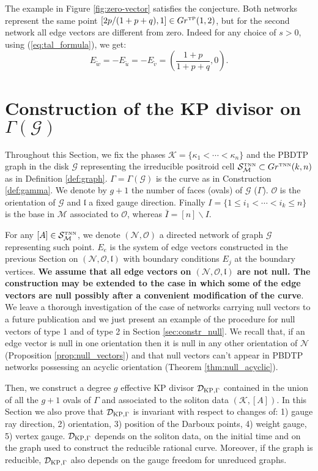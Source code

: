 \documentclass[11pt]{amsart}
\theoremstyle{plain}
\numberwithin{equation}{section}
\def \GTNN {{Gr^{\mbox{\tiny TNN}} (k,n)}}
\def \DKP {{\mathcal D}_{\textup{\scriptsize KP},\Gamma}}
\def \S {{\mathcal S}_{\mathcal M}^{\mbox{\tiny TNN}}}
\begin{document}
The example in Figure \ref{fig:zero-vector} satisfies the conjecture. Both networks represent the same point 
$[ 2p/(1+p+q),1] \in Gr^{\mbox{\tiny TP}}(1,2)$, but for the second network all edge vectors are different from zero. Indeed for any choice of $s>0$, using (\ref{eq:tal_formula}), we get:
$$
E_{\tilde w}=-E_{\tilde u}=-E_{\tilde v}=\left(\frac{1+p}{1+p+q},0\right).
$$

\section{Construction of the KP divisor on $\Gamma(\mathcal G)$}\label{sec:anycurve}

Throughout this Section, we fix the phases ${\mathcal K}= \{ \kappa_1 <\cdots< \kappa_n\}$ and the PBDTP graph in the disk $\mathcal G$ representing the irreducible positroid cell $\S \subset \GTNN$ as in Definition \ref{def:graph}. $\Gamma =\Gamma(\mathcal G)$ is the curve as in Construction
\ref{def:gamma}. We denote by $g+1$ the number of faces (ovals) of $\mathcal G$ ($\Gamma$).
$\mathcal O$ is the orientation of $\mathcal G$ and $\mathfrak l$ a fixed gauge direction. Finally $I=\{ 1\le i_1<\cdots < i_k\le n\}$ is the base in $\mathcal M$ associated to $\mathcal O$, whereas
$\bar I= [n] \backslash I$.

For any $[A]\in \S$, we denote $({\mathcal N}, \mathcal O)$ a directed network of graph $\mathcal G$ representing such point. $E_e$ is the system of edge vectors constructed in the previous Section on $({\mathcal N}, \mathcal O, \mathfrak l)$ with boundary conditions $E_j$ at the boundary vertices. 
\textbf{We assume that all edge vectors on $({\mathcal N}, \mathcal O, \mathfrak l)$ are not null. The construction may be extended to the case in which some of the edge vectors are null possibly after a convenient modification of the curve}. We leave a thorough investigation of the case of networks carrying null vectors to a future publication and we just present an example of the procedure for null vectors of type 1 and of type 2 in Section \ref{sec:constr_null}. We recall that, if an edge vector is null in one orientation then it is null in any other orientation of $\mathcal N$ (Proposition \ref{prop:null_vectors}) and that null vectors can't appear in PBDTP networks possessing an acyclic orientation (Theorem \ref{thm:null_acyclic}).

Then, we construct a degree $g$ effective KP divisor $\DKP$ contained in the union of all the $g+1$ ovals of $\Gamma$ and associated to the soliton data $(\mathcal K, [A])$. In this Section we also prove that $\DKP$ is invariant with respect to changes of: 1) gauge ray direction, 2) orientation, 3) position of the Darboux points, 4) weight gauge, 5) vertex gauge.  $\DKP$ depends on the soliton data, on the initial time and on the graph used to construct the reducible rational curve. Moreover, if the graph is reducible, $\DKP$ also depends on the gauge freedom for unreduced graphs.
\end{document}
